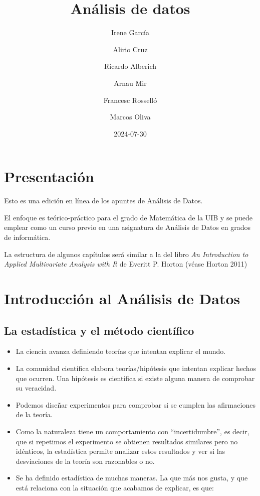 \documentclass[
  letterpaper,
  DIV=11,
  numbers=noendperiod]{scrreprt}
\title{Análisis de datos}
\author{Irene García \and Alirio Cruz \and Ricardo Alberich \and Arnau
Mir \and Francesc Rosselló \and Marcos Oliva}
\date{2024-07-30}
\renewcommand*\contentsname{Tabla de contenidos}
\newcommand\contentsname{Tabla de contenidos}
\begin{document}
\maketitle

\renewcommand*\contentsname{Tabla de contenidos}
{
\hypersetup{linkcolor=}
\setcounter{tocdepth}{2}
\tableofcontents
}

\chapter*{Presentación}\label{presentaciuxf3n}


Esto es una edición en línea de los apuntes de Análisis de Datos.

El enfoque es teórico-práctico para el grado de Matemática de la UIB y
se puede emplear como un curso previo en una asignatura de Análisis de
Datos en grados de informática.

La estructura de algunos capítulos será similar a la del libro \emph{An
Introduction to Applied Multivariate Analysis with R} de Everitt P.
Horton (véase Horton 2011)


\chapter{Introducción al Análisis de
Datos}\label{introducciuxf3n-al-anuxe1lisis-de-datos}

\section{La estadística y el método
científico}\label{la-estaduxedstica-y-el-muxe9todo-cientuxedfico}

\begin{itemize}
\item
  La ciencia avanza definiendo teorías que intentan explicar el mundo.
\item
  La comunidad científica elabora teorías/hipótesis que intentan
  explicar hechos que ocurren. Una hipótesis es científica si existe
  alguna manera de comprobar su veracidad.
\item
  Podemos diseñar experimentos para comprobar si se cumplen las
  afirmaciones de la teoría.
\item
  Como la naturaleza tiene un comportamiento con ``incertidumbre'', es
  decir, que si repetimos el experimento se obtienen resultados
  similares pero no idénticos, la estadística permite analizar estos
  resultados y ver si las desviaciones de la teoría son razonables o no.
\item
  Se ha definido estadística de muchas maneras. La que más nos gusta, y
  que está relaciona con la situación que acabamos de explicar, es que:
\end{itemize}
\end{document}

